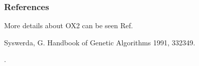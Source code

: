 \documentclass[letterpaper,10pt,english]{sphinxmanual}
\begin{document}
\begin{fulllineitems}
\begin{quote}
\begin{description}
\begin{description}
\end{description}

\end{description}\end{quote}
\subsubsection*{References}

\sphinxAtStartPar
More details about OX2 can be seen Ref. %
\begin{footnote}[2]\sphinxAtStartFootnote
Syswerda, G. Handbook of Genetic Algorithms 1991, 332\sphinxhyphen{}349.
%
\end{footnote}.

\end{fulllineitems}

\end{document}
